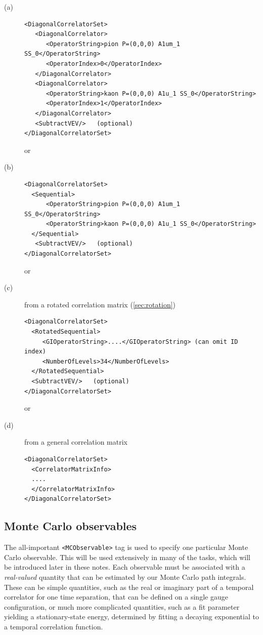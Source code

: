 \documentclass[12pt]{article}
\newcommand{\vb}{\texttt}
\begin{document}
\begin{description}
\item[(a)]
\begin{verbatim}
<DiagonalCorrelatorSet>
   <DiagonalCorrelator>
      <OperatorString>pion P=(0,0,0) A1um_1 SS_0</OperatorString>
      <OperatorIndex>0</OperatorIndex>
   </DiagonalCorrelator>
   <DiagonalCorrelator>
      <OperatorString>kaon P=(0,0,0) A1u_1 SS_0</OperatorString>
      <OperatorIndex>1</OperatorIndex>
   </DiagonalCorrelator>
   <SubtractVEV/>   (optional)
</DiagonalCorrelatorSet>
\end{verbatim}
or
\item[(b)]
\begin{verbatim}
<DiagonalCorrelatorSet>
  <Sequential>
      <OperatorString>pion P=(0,0,0) A1um_1 SS_0</OperatorString>
      <OperatorString>kaon P=(0,0,0) A1u_1 SS_0</OperatorString>
  </Sequential>
   <SubtractVEV/>   (optional)
</DiagonalCorrelatorSet>
\end{verbatim}
or
\item[(c)] from a rotated correlation matrix (\ref{sec:rotation})
\begin{verbatim}
<DiagonalCorrelatorSet>
  <RotatedSequential>
     <GIOperatorString>....</GIOperatorString> (can omit ID index)
     <NumberOfLevels>34</NumberOfLevels>
  </RotatedSequential>
  <SubtractVEV/>   (optional)
</DiagonalCorrelatorSet>
\end{verbatim}
or
\item[(d)] from a general correlation matrix
\begin{verbatim}
<DiagonalCorrelatorSet>
  <CorrelatorMatrixInfo>
  ....
  </CorrelatorMatrixInfo>
</DiagonalCorrelatorSet>
\end{verbatim}
\end{description}

\subsection{Monte Carlo observables} \label{sec:mcobs}

The all-important \vb{<MCObservable>} tag is used to specify one particular
Monte Carlo observable. This will be used extensively in many
of the tasks, which will be introduced later in these notes.
Each observable must be associated with a \textit{real-valued}
quantity that can be estimated by our Monte Carlo path integrals.
These can be simple quantities, such as the real or imaginary part of
a temporal correlator for one time separation, that can be
defined on a single gauge configuration, or much more
complicated quantities, such as a fit parameter yielding a
stationary-state energy, determined by fitting a decaying
exponential to a temporal correlation function.\\
\end{document}
